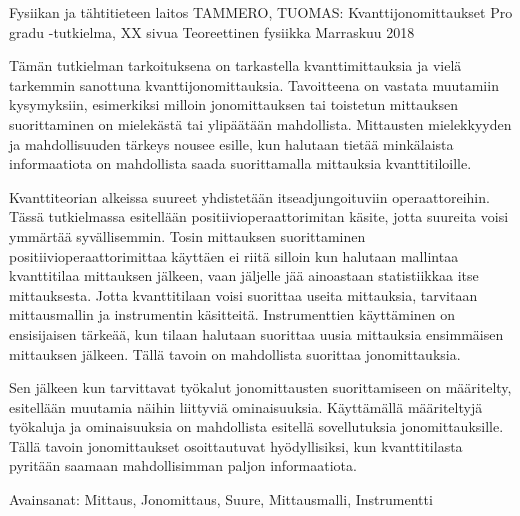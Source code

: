 \documentclass[a4paper,12pt]{wihuri}
\begin{document}
\begin{tiivistelma2}
        {Fysiikan ja tähtitieteen laitos}%
        {TAMMERO, TUOMAS:}%
        {Kvanttijonomittaukset}%
        {Pro gradu -tutkielma, XX sivua}%
        {Teoreettinen fysiikka}%
        {Marraskuu 2018}%

Tämän tutkielman tarkoituksena on tarkastella kvanttimittauksia ja vielä tarkemmin sanottuna kvanttijonomittauksia. Tavoitteena on vastata muutamiin kysymyksiin, esimerkiksi milloin jonomittauksen tai toistetun mittauksen suorittaminen on mielekästä tai ylipäätään mahdollista. Mittausten mielekkyyden ja mahdollisuuden tärkeys nousee esille, kun halutaan tietää minkälaista informaatiota on mahdollista saada suorittamalla mittauksia kvanttitiloille.

Kvanttiteorian alkeissa suureet yhdistetään itseadjungoituviin operaattoreihin. Tässä tutkielmassa esitellään positiivioperaattorimitan käsite, jotta suureita voisi ymmärtää syvällisemmin. Tosin mittauksen suorittaminen positiivioperaattorimittaa käyttäen ei riitä silloin kun halutaan mallintaa kvanttitilaa mittauksen jälkeen, vaan jäljelle jää ainoastaan statistiikkaa itse mittauksesta. Jotta kvanttitilaan voisi suorittaa useita mittauksia, tarvitaan mittausmallin ja instrumentin käsitteitä. Instrumenttien käyttäminen on ensisijaisen tärkeää, kun tilaan halutaan suorittaa uusia mittauksia ensimmäisen mittauksen jälkeen. Tällä tavoin on mahdollista suorittaa jonomittauksia.

Sen jälkeen kun tarvittavat työkalut jonomittausten suorittamiseen on määritelty, esitellään muutamia näihin liittyviä ominaisuuksia. Käyttämällä määriteltyjä työkaluja ja ominaisuuksia on mahdollista esitellä sovellutuksia jonomittauksille. Tällä tavoin jonomittaukset osoittautuvat hyödyllisiksi, kun kvanttitilasta pyritään saamaan mahdollisimman paljon informaatiota.


\noindent Avainsanat: Mittaus, Jonomittaus, Suure, Mittausmalli, Instrumentti
\end{tiivistelma2}
\end{document}
